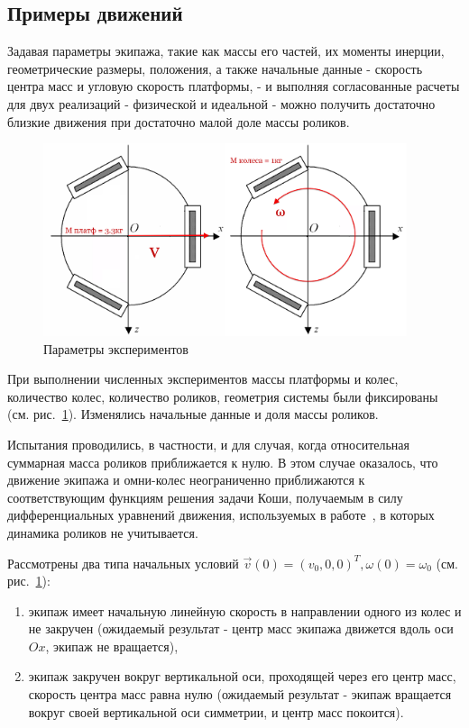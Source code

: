 

\subsection{Примеры движений}
Задавая параметры экипажа, такие как массы его частей, их моменты инерции, геометрические размеры, положения, а также начальные данные - скорость центра масс и угловую скорость платформы, - и выполняя согласованные расчеты для двух реализаций - физической и идеальной - можно получить достаточно близкие движения при достаточно малой доле массы роликов.

\begin{figure}[!ht]
    \centering
    \includegraphics[width=0.95\textwidth]{content/parts/3_friction/diploma/img/art/my_exp_setup.png}
    \caption{Параметры экспериментов}
    \label{fig:my_exp_setup}
\end{figure}

При выполнении численных экспериментов массы платформы и колес, количество колес, количество роликов, геометрия системы были фиксированы (см. рис.~\ref{fig:my_exp_setup}). Изменялись начальные данные и доля массы роликов.

Испытания проводились, в частности, и для случая, когда относительная суммарная масса роликов приближается к нулю. В этом случае оказалось, что движение экипажа и омни-колес неограниченно приближаются к соответствующим функциям решения задачи Коши, получаемым в силу дифференциальных уравнений движения, используемых в работе~\cite{Borisov2011}, в которых динамика роликов не учитывается.

Рассмотрены два типа начальных условий $\vec{v}(0) = (v_0, 0, 0)^T, \omega(0) = \omega_0$ (см. рис.~\ref{fig:my_exp_setup}):
\begin{enumerate}
\item экипаж имеет начальную линейную скорость в направлении одного из колес и не закручен (ожидаемый результат - центр масс экипажа движется вдоль оси $Ox$, экипаж не вращается),
\item экипаж закручен вокруг вертикальной оси, проходящей через его центр масс, скорость центра масс равна нулю (ожидаемый результат - экипаж вращается вокруг своей вертикальной оси симметрии, и центр масс покоится).
\end{enumerate}

